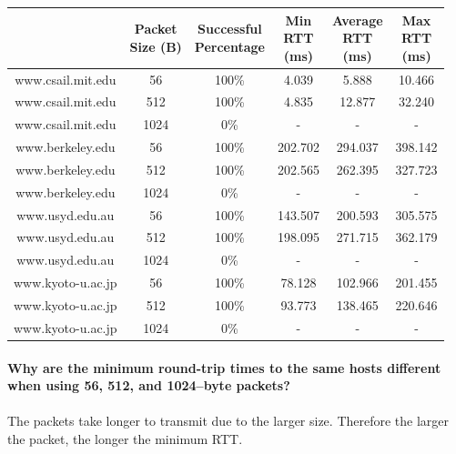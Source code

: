 \documentclass[12pt,a4paper]{article}
\begin{document}
		\begin{center}
			\begin{tabular}{||c c c c c c||} 
 				\hline
				\thead{Location} & \thead{Packet \\ Size (B)} & \thead{Successful \\ Percentage} & \thead{Min \\ RTT \\ (ms)} & \thead{Average \\ RTT \\ (ms)} & \thead{Max \\ RTT \\ (ms)} \\
 				\hline\hline
 				www.csail.mit.edu & 56 & 100\% & 4.039 & 5.888 & 10.466 \\ 
 				\hline
 				www.csail.mit.edu & 512 & 100\% & 4.835 & 12.877 & 32.240 \\ 
 				\hline
 				www.csail.mit.edu & 1024 & 0\% & - & - & - \\ 
 				\hline
 				www.berkeley.edu & 56 & 100\% & 202.702 & 294.037 & 398.142 \\ 
 				\hline
 				www.berkeley.edu & 512 & 100\% & 202.565 & 262.395 & 327.723 \\ 
 				\hline
 				www.berkeley.edu & 1024 & 0\% & - & - & - \\ 
 				\hline
				www.usyd.edu.au & 56 & 100\% & 143.507 & 200.593 & 305.575 \\ 
 				\hline
 				www.usyd.edu.au & 512 & 100\% & 198.095 & 271.715 & 362.179 \\ 
 				\hline
 				www.usyd.edu.au & 1024 & 0\% & - & - & - \\ 
 				\hline
				www.kyoto-u.ac.jp & 56 & 100\% & 78.128 & 102.966 & 201.455 \\ 
 				\hline
 				www.kyoto-u.ac.jp & 512 & 100\% & 93.773 & 138.465 & 220.646 \\ 
 				\hline
 				www.kyoto-u.ac.jp & 1024 & 0\% & - & - & - \\
 				\hline
			\end{tabular}
		\end{center}
		
		\paragraph{Why are the minimum round-trip times to the same hosts different when using 56, 512, and 1024–byte packets?}
		\paragraph{}
			The packets take longer to transmit due to the larger size. Therefore the larger the packet, the longer the minimum RTT.
			
\end{document}
